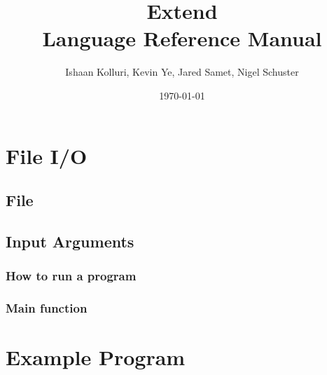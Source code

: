 \documentclass[titlepage]{article}
\title{Extend\\ Language Reference Manual}
\author{Ishaan Kolluri, Kevin Ye, Jared Samet, Nigel Schuster}
\date{\today}
\begin{document}
\maketitle
\tableofcontents



\section{File I/O} \label{IO}
\subsection{File}
\subsection{Input Arguments}
\subsubsection{How to run a program}
\subsubsection{Main function}
\section{Example Program}
\end{document}
